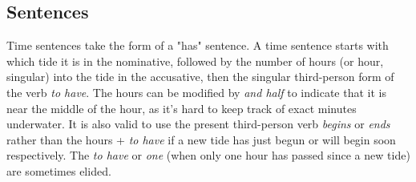 \documentclass{article}
\begin{document}
\subsection{Sentences}
Time sentences take the form of a "has" sentence.  A time sentence starts with which tide it is in the nominative, followed by the number of hours (or hour, singular) into the tide in the accusative, then the singular third-person form of the verb \textit{to have}.  The hours can be modified by \textit{and half} to indicate that it is near the middle of the hour, as it's hard to keep track of exact minutes underwater.  It is also valid to use the present third-person verb \textit{begins} or \textit{ends} rather than the hours + \textit{to have} if a new tide has just begun or will begin soon respectively.  The \textit{to have} or \textit{one} (when only one hour has passed since a new tide) are sometimes elided.
\end{document}
